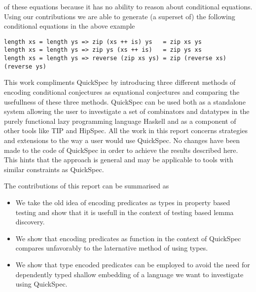 of these equations because it has no ability to reason about
conditional equations.
Using our contributions we are able to generate (a superset of) the following conditional
equations in the above example
\begin{verbatim}
length xs = length ys => zip (xs ++ is) ys   = zip xs ys
length xs = length ys => zip ys (xs ++ is)   = zip ys xs
length xs = length ys => reverse (zip xs ys) = zip (reverse xs) (reverse ys)
\end{verbatim}
This work compliments QuickSpec by introducing three different methods
of encoding conditional conjectures as equational conjectures and comparing
the usefullness of these three methods. QuickSpec can be used both as a standalone
system allowing the user to investigate a set of combinators and datatypes in the
purely functional lazy programming language Haskell and as a component of other tools %
like TIP\cite{Rosen2015} and HipSpec\cite{Claessen2013}. 
All the work in this report concerns strategies and extensions to the way a user would
use QuickSpec. No changes have been made to the code of QuickSpec in order to
achieve the results described here. This hints that the approach is general
and may be applicable to tools with similar constraints as QuickSpec.

The contributions of this report can be summarised as
\begin{itemize}
    \item We take the old idea of encoding predicates as types
        in property based testing and show that it is usefull in
        the context of testing based lemma discovery.

    \item We show that encoding predicates as function in the context
        of QuickSpec compares unfavorably to the laternative method
        of using types.

    \item We show that type encoded predicates can be employed to avoid 
        the need for dependently typed shallow embedding of a language
        we want to investigate using QuickSpec.
\end{itemize}
